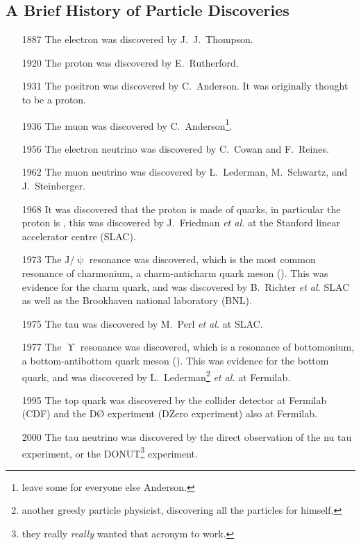 \documentclass[fleqn]{NotesClass}
\newcommand{\PJpsi}{\ensuremath{\mathrm{J}/\uppsi}}
\begin{document}
    \subsection{A Brief History of Particle Discoveries}
    \begin{enumerate}
        \item[1887] The electron was discovered by J.~J.~Thompson.
        \item[1920] The proton was discovered by E.~Rutherford.
        \item[1931] The positron was discovered by C.~Anderson.
        It was originally thought to be a proton.
        \item[1936] The muon was discovered by C.~Anderson\footnote{leave some for everyone else Anderson.}.
        \item[1956] The electron neutrino was discovered by C.~Cowan and F.~Reines.
        \item[1962] The muon neutrino was discovered by L.~Lederman, M.~Schwartz, and J.~Steinberger.
        \item[1968] It was discovered that the proton is made of quarks, in particular the proton is \Pu\Pu\Pd, this was discovered by J.~Friedman \textit{et al.} at the Stanford linear accelerator centre (SLAC).
        \item[1973] The \PJpsi{} resonance was discovered, which is the most common resonance of charmonium, a charm-anticharm quark meson (\Pc\APc).
        This was evidence for the charm quark, and was discovered by B.~Richter \textit{et al.} SLAC as well as the Brookhaven national laboratory (BNL).
        \item[1975] The tau was discovered by M.~Perl \textit{et al.} at SLAC.
        \item[1977] The \(\upUpsilon\) resonance was discovered, which is a resonance of bottomonium, a bottom-antibottom quark meson (\Pb\APb).
        This was evidence for the bottom quark, and was discovered by L.~Lederman\footnote{another greedy particle physicist, discovering all the particles for himself.} \textit{et al.} at Fermilab.
        \item[1995] The top quark was discovered by the collider detector at Fermilab (CDF) and the DØ experiment (DZero experiment) also at Fermilab.
        \item[2000] The tau neutrino was discovered by the direct observation of the nu tau experiment, or the DONUT\footnote{they really \emph{really} wanted that acronym to work.} experiment.

\end{enumerate}
\end{document}
